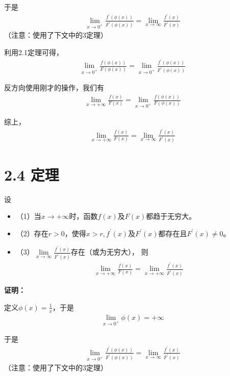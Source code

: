 \documentclass{article}
\begin{document}
于是
\begin{align*}
  \lim\limits_{x \to 0^{+}} \frac{f^\prime(\phi(x))}{F^\prime(\phi(x))}
  =
  \lim\limits_{x \to \infty} \frac{f^\prime(x)}{F^\prime(x)}
\end{align*}
（注意：使用了下文中的3定理）

利用2.1定理可得，
\begin{align*}
  \lim\limits_{x \to 0^{+}} \frac{f(\phi(x))}{F(\phi(x))}
  =
  \lim\limits_{x \to 0^{+}} \frac{f^\prime(\phi(x))}{F^\prime(\phi(x))}
\end{align*}

反方向使用刚才的操作，我们有
\begin{align*}
  \lim\limits_{x \to +\infty} \frac{f(x)}{F(x)}
  =
  \lim\limits_{x \to 0^{+}} \frac{f(\phi(x))}{F(\phi(x))}
\end{align*}

综上，
\begin{align*}
  \lim\limits_{x \to +\infty} \frac{f(x)}{F(x)}
  =
  \lim\limits_{x \to \infty} \frac{f^\prime(x)}{F^\prime(x)}
\end{align*}

\section*{2.4 定理}
\begin{zremark}
  设
  \begin{itemize}
    \item （1）当$x \to +\infty$时，函数$f(x)$及$F(x)$都趋于无穷大。
    \item （2）存在$r > 0$，使得$x > r, f^\prime(x)$及$F^\prime(x)$都存在且$F^\prime(x) \not = 0$。
    \item （3）$\lim\limits_{x \to \infty} \frac{f^\prime(x)}{F^\prime(x)}$存在（或为无穷大），
          则
          \begin{align*}
            \lim\limits_{x \to +\infty} \frac{f(x)}{F(x)} = \lim\limits_{x \to +\infty} \frac{f^\prime(x)}{F^\prime(x)}
          \end{align*}
  \end{itemize}
\end{zremark}

\textbf{证明：}

定义$\phi(x) = \frac{1}{x}$，于是
\begin{align*}
  \lim\limits_{x \to 0^{+}} \phi(x) = +\infty
\end{align*}

于是
\begin{align*}
  \lim\limits_{x \to 0^{+}} \frac{f^\prime(\phi(x))}{F^\prime(\phi(x))}
  =
  \lim\limits_{x \to \infty} \frac{f^\prime(x)}{F^\prime(x)}
\end{align*}
（注意：使用了下文中的3定理）
\end{document}
